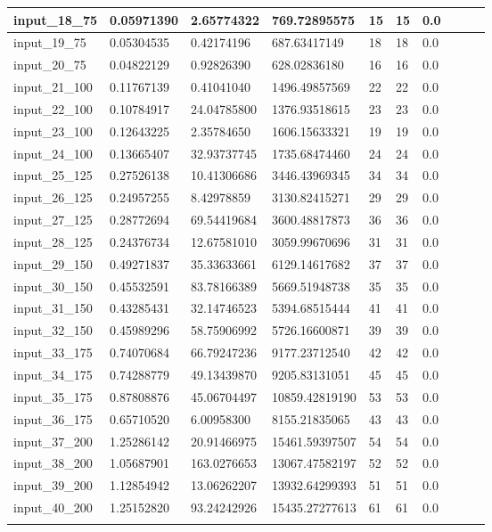 \begin{tabularx}{\textwidth}{*{10}{Y}}
	input\_18\_75	&	0.05971390	&	2.65774322	&	769.72895575	&	15	&	15	 & 0.0	\\\midrule
	input\_19\_75	&	0.05304535	&	0.42174196	&	687.63417149	&	18	&	18	 & 0.0	\\\midrule
	input\_20\_75	&	0.04822129	&	0.92826390	&	628.02836180	&	16	&	16	 & 0.0	\\\midrule
	input\_21\_100	&	0.11767139	&	0.41041040	&	1496.49857569	&	22	&	22 & 0.0	\\\midrule
	input\_22\_100	&	0.10784917	&	24.04785800	&	1376.93518615	&	23	&	23 & 0.0	\\\midrule
	input\_23\_100	&	0.12643225	&	2.35784650	&	1606.15633321	&	19	&	19 & 0.0	\\\midrule
	input\_24\_100	&	0.13665407	&	32.93737745	&	1735.68474460	&	24	&	24 & 0.0	\\\midrule
	input\_25\_125	&	0.27526138	&	10.41306686	&	3446.43969345	&	34	&	34 & 0.0	\\\midrule
	input\_26\_125	&	0.24957255	&	8.42978859	&	3130.82415271	&	29	&	29 & 0.0	\\\midrule
	input\_27\_125	&	0.28772694	&	69.54419684	&	3600.48817873	&	36	&	36 & 0.0	\\\midrule
	input\_28\_125	&	0.24376734	&	12.67581010	&	3059.99670696	&	31	&	31 & 0.0	\\\midrule
	input\_29\_150	&	0.49271837	&	35.33633661	&	6129.14617682	&	37	&	37 & 0.0	\\\midrule
	input\_30\_150	&	0.45532591	&	83.78166389	&	5669.51948738	&	35	&	35 & 0.0	\\\midrule
	input\_31\_150	&	0.43285431	&	32.14746523	&	5394.68515444	&	41	&	41 & 0.0	\\\midrule
	input\_32\_150	&	0.45989296	&	58.75906992	&	5726.16600871	&	39	&	39 & 0.0	\\\midrule
	input\_33\_175	&	0.74070684	&	66.79247236	&	9177.23712540	&	42	&	42 & 0.0	\\\midrule
	input\_34\_175	&	0.74288779	&	49.13439870	&	9205.83131051	&	45	&	45 & 0.0	\\\midrule
	input\_35\_175	&	0.87808876	&	45.06704497	&	10859.42819190	&	53	&	53 & 0.0	\\\midrule
	input\_36\_175	&	0.65710520	&	6.00958300	&	8155.21835065	&	43	&	43 & 0.0	\\\midrule
	input\_37\_200	&	1.25286142	&	20.91466975	&	15461.59397507	&	54	&	54 & 0.0	\\\midrule
	input\_38\_200	&	1.05687901	&	163.0276653	&	13067.47582197	&	52	&	52 & 0.0	\\\midrule
	input\_39\_200	&	1.12854942	&	13.06262207	&	13932.64299393	&	51	&	51 & 0.0	\\\midrule
	input\_40\_200	&	1.25152820	&	93.24242926	&	15435.27277613	&	61	&	61 & 0.0 \\\bottomrule
    \caption{Risultati}\label{tab:risultati}
\end{tabularx}

\normalsize